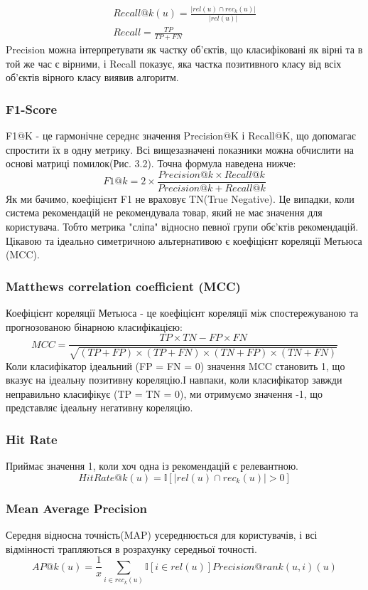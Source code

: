 \begin{align}
    Recall@k(u)=\frac{|rel(u) \cap rec_{k}(u)|}{|rel(u)|} \\
    Recall = \frac{TP}{TP+FN}
\end{align}
Precision можна інтерпретувати як частку об'єктів, що класифіковані як вірні та в той же час є вірними, і Recall показує, яка частка позитивного класу від всіх об'єктів вірного класу виявив алгоритм.
\subsubsection{F1-Score}
F1@K - це гармонічне середнє значення Precision@K і Recall@K, що допомагає спростити їх в одну метрику. Всі вищезазначені показники можна обчислити на основі матриці помилок(Рис. 3.2). Точна формула наведена нижче:
\[F1@k = 2 \times \frac{Precision@k \times Recall@k}{Precision@k + Recall@k} \]
Як ми бачимо, коефіцієнт F1 не враховує TN(True Negative). Це випадки, коли система рекомендацій не рекомендувала товар, який не має значення для користувача. Тобто метрика "сліпа" відносно певної групи обє’ктів рекомендацій. Цікавою та ідеально симетричною альтернативою є коефіцієнт кореляції Метьюса (MCC).
\subsubsection{Matthews correlation coefficient (MCC)}
Коефіцієнт кореляції Метьюса - це коефіцієнт кореляції між спостережуваною та прогнозованою бінарною класифікацією:
\[ MCC = \frac{TP\times TN - FP \times FN}{\sqrt{(TP + FP)\times(TP + FN)\times (TN+FP)\times (TN+FN)}}\]
Коли класифікатор ідеальний (FP = FN = 0) значення MCC становить 1, що вказує на ідеальну позитивну кореляцію.І навпаки, коли класифікатор завжди неправильно класифікує (TP = TN = 0), ми отримуємо значення -1, що представляє ідеальну негативну кореляцію.
\subsubsection{Hit Rate}
Приймає значення 1, коли хоч одна із рекомендацій є релевантною.
\[
    HitRate@k(u)=\mathbb{I}[|rel(u) \cap rec_{k}(u)| > 0]
\]
\subsubsection{Mean Average Precision}
Середня відносна точність(MAP) усереднюється для користувачів, і всі відмінності трапляються в розрахунку середньої точності.
\[
    AP@k(u)=\frac{1}{x}\sum\limits_{i \in rec_{k}(u)}\mathbb{I}[i \in rel(u)]Precision@rank(u,i)(u)
\]
